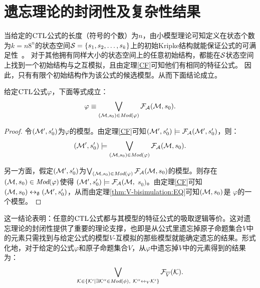 \section{遗忘理论的封闭性及复杂性结果}\label{chapter06:sec:close}
当给定的$\textrm{CTL}$公式的长度（符号的个数）为$n$，由小模型理论可知定义在状态个数为$k=n8^n$的状态空间${\cal S}=\{s_1,s_2,\dots, s_k\}$上的初始Kripke结构就能保证公式的可满足性~\cite{DBLP:journals/jcss/EmersonH85}。
对于其他拥有同样大小的状态空间上的任意初始结构，都能在${\cal S}$状态空间上找到一个初始结构与之互模拟，且由定理\ref{CF}可知他们有相同的特征公式。
因此，只有有限个初始结构作为该公式的候选模型。从而下面结论成立。

\begin{lemma}\label{lem:models:formula}
	给定$\textrm{CTL}$公式$\varphi$，下面等式成立：
	\begin{equation*}
		\varphi\equiv \bigvee_{({\cal M}, s_0)\in\textit{Mod}(\varphi)}{\cal F}_{\cal A}({\cal M}, s_0).
	\end{equation*}
\end{lemma}
\begin{proof}
	令$({\cal M}', s_0')$为$\varphi$的模型。由定理\ref{CF}可知$({\cal M}', s_0') \models {\cal F}_{{\cal A}}({\cal M}', s_0')$，则：
	$$({\cal M}', s_0') \models \bigvee_{({\cal M}, s_0)\in \textit{Mod}(\varphi)} {\cal F}_{{\cal A}}({\cal M}, s_0).$$
	
	另一方面，假定$({\cal M}', s_0')$为$\bigvee_{({\cal M}, s_0)\in \textit{Mod}(\varphi)} {\cal F}_{{\cal A}}({\cal M}, s_0)$的模型。则存在$({\cal M}, s_0)\in \textit{Mod}(\varphi)$使得 $({\cal M}', s_0') \models {\cal F}_{{\cal A}}({\cal M},$ $s_0)$。由定理\ref{CF}可知$({\cal M}, s_0) \leftrightarrow_{\emptyset} ({\cal M}', s_0')$，从而由定理\ref{thm:V-bisimulation:EQ}可知$({\cal M}, s_0)$是 $\varphi$的一个模型。
\end{proof}

这一结论表明：任意的$\textrm{CTL}$公式都与其模型的特征公式的吸取逻辑等价。这对遗忘理论的封闭性提供了重要的理论支撑，也即是从公式里遗忘掉原子命题集合$V$中的元素只需找到与给定公式的模型$V$-互模拟的那些模型就能确定遗忘的结果。形式化地，对于给定的公式$\varphi$和原子命题集合$V$，从$\varphi$中遗忘掉$V$中的元素得到的结果为：
\begin{equation*}
	\bigvee_{{\cal K}\in  \{{\cal K}'\mid \exists {\cal K}''\in\textit{Mod}(\phi),\ {\cal K}''\leftrightarrow_V{\cal K}'\}} {\cal F}_{\overline V}({\cal K}).
\end{equation*}



